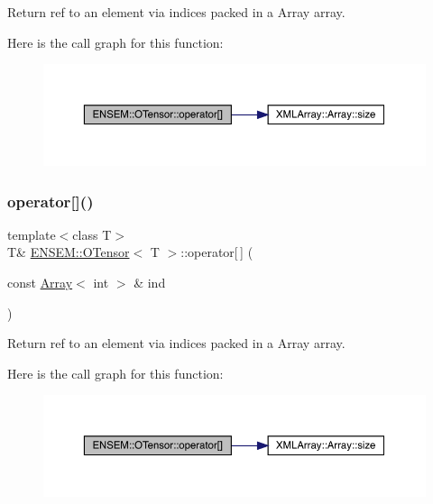Return ref to an element via indices packed in a Array array. 

Here is the call graph for this function\+:
\nopagebreak
\begin{figure}[H]
\begin{center}
\leavevmode
\includegraphics[width=350pt]{da/d8a/classENSEM_1_1OTensor_adbfded2bb2af9d68e0a040df0d19b2d6_cgraph}
\end{center}
\end{figure}
\mbox{\label{classENSEM_1_1OTensor_adbfded2bb2af9d68e0a040df0d19b2d6}} 
\subsubsection{\texorpdfstring{operator[]()}{operator[]()}\hspace{0.1cm}{\footnotesize\ttfamily [2/6]}}
{\footnotesize\ttfamily template$<$class T$>$ \\
T\& \mbox{\hyperlink{classENSEM_1_1OTensor}{E\+N\+S\+E\+M\+::\+O\+Tensor}}$<$ T $>$\+::operator\mbox{[}$\,$\mbox{]} (\begin{DoxyParamCaption}\item[{const \mbox{\hyperlink{classXMLArray_1_1Array}{Array}}$<$ int $>$ \&}]{ind }\end{DoxyParamCaption})\hspace{0.3cm}{\ttfamily [inline]}}



Return ref to an element via indices packed in a Array array. 

Here is the call graph for this function\+:
\nopagebreak
\begin{figure}[H]
\begin{center}
\leavevmode
\includegraphics[width=350pt]{da/d8a/classENSEM_1_1OTensor_adbfded2bb2af9d68e0a040df0d19b2d6_cgraph}
\end{center}
\end{figure}
\mbox{\label{classENSEM_1_1OTensor_adbfded2bb2af9d68e0a040df0d19b2d6}} 
